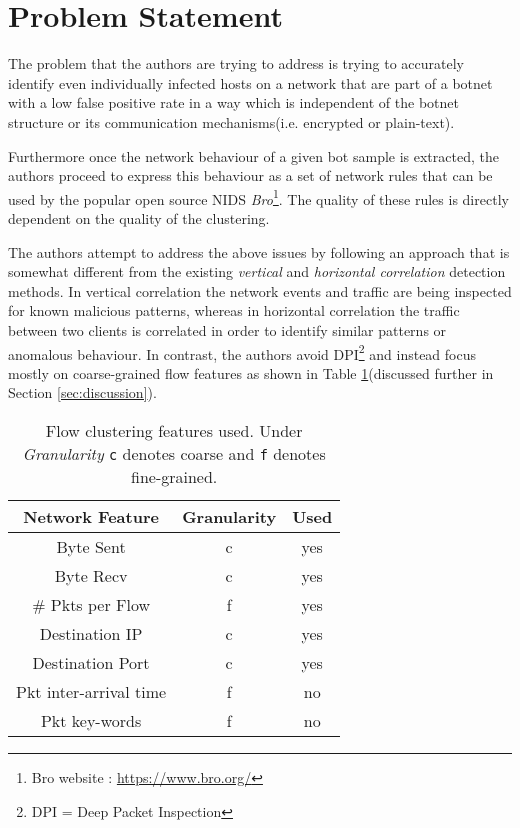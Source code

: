 \documentclass[12pt,a4paper,twocolumn]{article}
\begin{document}
	\section{Problem Statement}
	The problem that the authors are trying to address is trying to accurately identify even individually infected hosts on a network that are part of a botnet with a low false positive rate in a way which is independent of the botnet structure or its communication mechanisms(i.e. encrypted or plain-text).
	
	Furthermore once the network behaviour of a given bot sample is extracted, the authors proceed to express this behaviour as a set of network rules that can be used by the popular open source NIDS \emph{Bro}\footnote{Bro website : \href{https://www.bro.org/}{https://www.bro.org/}}. The quality of these rules is directly dependent on the quality of the clustering.
	
	The authors attempt to address the above issues by following an approach that is somewhat different from the existing \emph{vertical} and \emph{horizontal correlation} detection methods. In vertical correlation the network events and traffic are being inspected for known malicious patterns, whereas in horizontal correlation the traffic between two clients is correlated in order to identify similar patterns or anomalous behaviour. In contrast, the authors avoid DPI\footnote{DPI = Deep Packet Inspection} and instead focus mostly on coarse-grained flow features as shown in Table \ref{table:features_used}(discussed further in Section \ref{sec:discussion}).
	
\begin{table}
	\begin{tabular}{ c | c | c}
	\textbf{Network Feature} & \textbf{Granularity} & \textbf{Used}\\
	\hline
	\hline
	Byte Sent & c & yes \\
	Byte Recv & c & yes \\
	\# Pkts per Flow & f & yes \\
	Destination IP & c & yes \\
	Destination Port & c & yes \\
	Pkt inter-arrival time & f & no \\
	Pkt key-words & f & no \\
	
	\end{tabular}
	\caption{Flow clustering features used. Under \emph{Granularity} \texttt{c} denotes coarse and \texttt{f} denotes fine-grained.}
	\label{table:features_used}
\end{table}
\end{document}
